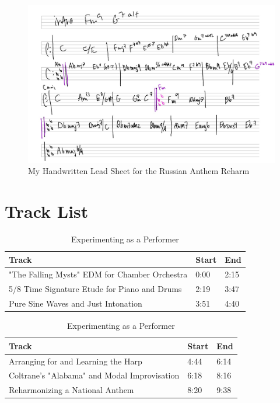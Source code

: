 \documentclass[12pt]{article}
\begin{document}
\begin{figure}[H]
\centering
\includegraphics[width=0.85\linewidth]{anthem}
\caption{My Handwritten Lead Sheet for the Russian Anthem Reharm}
\label{fig:anthem}
\end{figure}


\section{Track List}

\begin{table}[H]
\centering
\begin{tabularx}{0.9\textwidth}{@{}lX@{}X@{}}
\toprule
\textbf{Track} & \textbf{Start} & \textbf{End} \\ \midrule
"The Falling Mysts" EDM for Chamber Orchestra & 0:00 & 2:15 \\
5/8 Time Signature Etude for Piano and Drums & 2:19 & 3:47 \\
Pure Sine Waves and Just Intonation & 3:51 & 4:40 \\ \bottomrule
\end{tabularx}
\caption{Experimenting as a Creator}
\vspace*{0.5cm}
\begin{tabularx}{0.9\textwidth}{@{}lX@{}X@{}}
\toprule
\textbf{Track} & \textbf{Start} & \textbf{End} \\ \midrule
Arranging for and Learning the Harp & 4:44 & 6:14 \\
Coltrane's "Alabama" and Modal Improvisation\hspace*{10pt} & 6:18 & 8:16 \\
Reharmonizing a National Anthem & 8:20 & 9:38 \\ \bottomrule
\end{tabularx}
\caption{Experimenting as a Performer}
\end{table}
\end{document}
